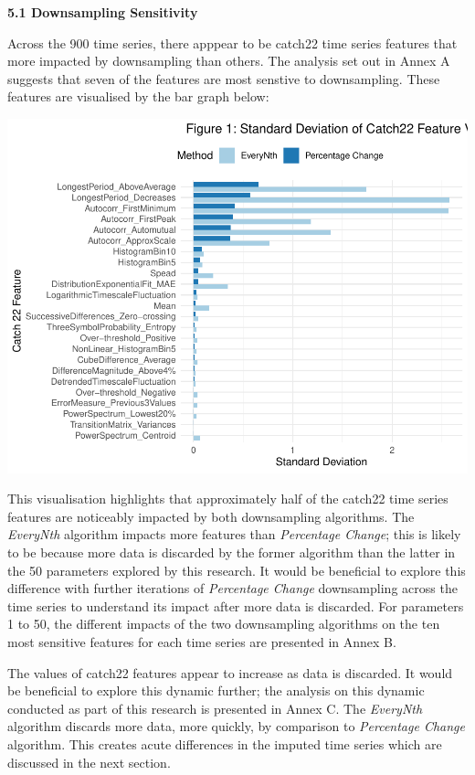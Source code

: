 \documentclass{article}
\begin{document}
\label{sec:headings}

\textbf{5.1 Downsampling Sensitivity}

Across the 900 time series, there apppear to be catch22 time series
features that more impacted by downsampling than others. The analysis
set out in Annex A suggests that seven of the features are most senstive
to downsampling. These features are visualised by the bar graph below:

\includegraphics{210431461_CSC8639_Dissertation_files/figure-latex/CombinedSensitivity-1.pdf}

This visualisation highlights that approximately half of the catch22
time series features are noticeably impacted by both downsampling
algorithms. The \emph{EveryNth} algorithm impacts more features than
\emph{Percentage Change}; this is likely to be because more data is
discarded by the former algorithm than the latter in the 50 parameters
explored by this research. It would be beneficial to explore this
difference with further iterations of \emph{Percentage Change}
downsampling across the time series to understand its impact after more
data is discarded. For parameters 1 to 50, the different impacts of the
two downsampling algorithms on the ten most sensitive features for each
time series are presented in Annex B.

The values of catch22 features appear to increase as data is discarded.
It would be beneficial to explore this dynamic further; the analysis on
this dynamic conducted as part of this research is presented in Annex C.
The \emph{EveryNth} algorithm discards more data, more quickly, by
comparison to \emph{Percentage Change} algorithm. This creates acute
differences in the imputed time series which are discussed in the next
section.
\end{document}
